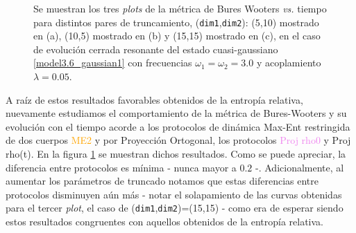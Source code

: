 \documentclass{report} %
\numberwithin{equation}{section}
\begin{document}
\begin{figure}
\caption{Se muestran los tres \textit{plots} de la métrica de Bures Wooters \textit{vs.} tiempo para distintos pares de truncamiento, (\texttt{dim1},\texttt{dim2}): (5,10) mostrado en (a), (10,5) mostrado en (b) y (15,15) mostrado en (c), en el caso de evolución cerrada resonante del estado cuasi-gaussiano \eqref{model3.6_gaussian1} con frecuencias $\omega_1 = \omega_2 = 3.0$ y  acoplamiento $\lambda = 0.05$.}
\label{bxb-closed-res/bxb_closed_r.png}
\end{figure}

A raíz de estos resultados favorables obtenidos de la entropía relativa, nuevamente estudiamos el comportamiento de la métrica de Bures-Wooters y su evolución con el tiempo acorde a los protocolos de dinámica Max-Ent restringida de dos cuerpos \textcolor{orange}{ME2} y por Proyección Ortogonal, los protocolos \textcolor{violet}{Proj rho0} y \textcolor{awesome}{Proj rho(t)}. En la figura \ref{bxb-closed-res/bxb_closed_r.png} se muestran dichos resultados. Como se puede apreciar, la diferencia entre protocolos es mínima - nunca mayor a $0.2$ -. Adicionalmente, al aumentar los parámetros de truncado notamos que estas diferencias entre protocolos disminuyen aún más - notar el solapamiento de las curvas obtenidas para el tercer \textit{plot}, el caso de (\texttt{dim1},\texttt{dim2})=(15,15) - como era de esperar siendo estos resultados congruentes con aquellos obtenidos de la entropía relativa.
\end{document}
